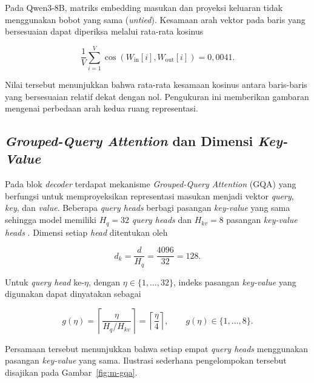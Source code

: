 Pada Qwen3-8B, matriks embedding masukan dan proyeksi keluaran tidak menggunakan bobot yang sama (\textit{untied}). Kesamaan arah vektor pada baris yang bersesuaian dapat diperiksa melalui rata-rata kosinus

\begin{equation}
\frac{1}{V}
\sum_{i=1}^{V}
\cos
\left(
W_{\mathrm{in}}[i],
W_{\mathrm{out}}[i]
\right)
=
0{,}0041.
\label{eq:m-arch-cos}
\end{equation}

Nilai tersebut menunjukkan bahwa rata-rata kesamaan kosinus antara baris-baris yang bersesuaian relatif dekat dengan nol. Pengukuran ini memberikan gambaran mengenai perbedaan arah kedua ruang representasi.

\subsection{\textit{Grouped-Query Attention} dan Dimensi \textit{Key-Value}}
\label{subsec:m-gqa}

Pada blok \textit{decoder} terdapat mekanisme \textit{Grouped-Query Attention} (GQA) yang berfungsi untuk memproyeksikan representasi masukan menjadi vektor \textit{query}, \textit{key}, dan \textit{value}. 
Beberapa \textit{query heads} berbagi pasangan \textit{key-value} yang sama sehingga model memiliki $H_q=32$ \textit{query heads} dan $H_{kv}=8$ pasangan \textit{key-value heads} \citep{qwen3}. 
Dimensi setiap \textit{head} ditentukan oleh

\begin{equation}
d_k
=
\frac{d}{H_q}
=
\frac{4096}{32}
=
128.
\label{eq:m-arch-dk}
\end{equation}

Untuk \textit{query head} ke-$\eta$, dengan $\eta\in\{1,\ldots,32\}$, indeks pasangan \textit{key-value} yang digunakan dapat dinyatakan sebagai

\begin{equation}
g(\eta)
=
\left\lceil
\frac{\eta}{H_q/H_{kv}}
\right\rceil
=
\left\lceil
\frac{\eta}{4}
\right\rceil,
\qquad
g(\eta)\in\{1,\ldots,8\}.
\label{eq:m-arch-gqa}
\end{equation}

Persamaan tersebut menunjukkan bahwa setiap empat \textit{query heads} menggunakan pasangan \textit{key-value} yang sama. Ilustrasi sederhana pengelompokan tersebut disajikan pada Gambar~\ref{fig:m-gqa}.

